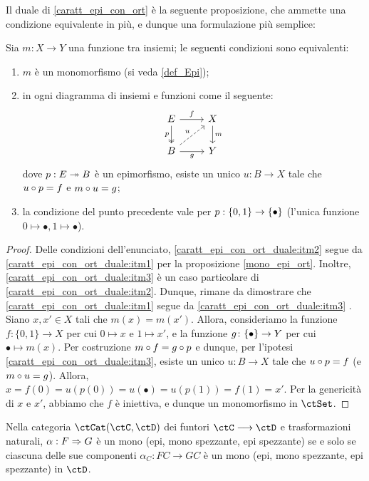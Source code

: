 Il duale di \ref{caratt_epi_con_ort} è la seguente proposizione, che ammette una condizione equivalente in più, e dunque una formulazione più semplice:
\begin{proposition}\label{caratt_epi_con_ort_duale}
	Sia \(m : X\to Y\) una funzione tra insiemi; le seguenti condizioni sono equivalenti:
	\begin{enumerate}
		\item\label{caratt_epi_con_ort_duale:itm1} \(m\) è un monomorfismo (si veda \ref{def_Epi});
		\item\label{caratt_epi_con_ort_duale:itm2} in ogni diagramma di insiemi e funzioni come il seguente:
		      \[\begin{tikzcd}
				      E \ar[r, "f"]\ar[d, two heads, "p"']& X \ar[d, "m"]\\
				      B \ar[r, "g"'] \ar[ur, dashed, "u"]& Y
			      \end{tikzcd}\]
		      dove \(p : E\twoheadrightarrow B\) è un epimorfismo, esiste un unico \(u : B\to X\) tale che \(u\circ p = f\) e \(m\circ u = g\);
		\item\label{caratt_epi_con_ort_duale:itm3} la condizione del punto precedente vale per \(p : \{0,1\} \to \{\bullet\}\) (l'unica funzione \(0\mapsto\bullet, 1\mapsto\bullet\)).
	\end{enumerate}
\end{proposition}
\begin{proof}
	Delle condizioni dell'enunciato, \ref{caratt_epi_con_ort_duale:itm2} segue da \ref{caratt_epi_con_ort_duale:itm1} per la proposizione \ref{mono_epi_ort}.
	Inoltre, \ref{caratt_epi_con_ort_duale:itm3} \`e un caso particolare di \ref{caratt_epi_con_ort_duale:itm2}.
	Dunque, rimane da dimostrare che \ref{caratt_epi_con_ort_duale:itm1} segue da \ref{caratt_epi_con_ort_duale:itm3} .
	Siano \(x, x' \in X\) tali che \(m(x) = m(x')\).
	Allora, consideriamo la funzione \(f \colon \{0, 1\} \to X\) per cui \(0 \mapsto x\) e \(1 \mapsto x'\),
	e la funzione \(g \colon \{\bullet\} \to Y\) per cui \(\bullet \mapsto m(x)\).
	Per costruzione \(m \circ f = g \circ p\) e dunque, per l'ipotesi \ref{caratt_epi_con_ort_duale:itm3}, esiste un unico \(u : B\to X\) tale che \(u\circ p = f\) (e \(m\circ u = g\)).
	Allora, \(x = f(0) = u(p(0)) = u(\bullet) = u(p(1)) = f(1) = x'\).
	Per la genericit\`a di \(x\) e \(x'\), abbiamo che \(f\) \`e iniettiva,
	e dunque un monomorfismo in \(\ctSet\).
\end{proof}
\begin{proposition}\label{monoepi_in_catCD}
	Nella categoria \(\Hom\ctCat(\ctC,\ctD)\) dei funtori \(\ctC\fun\ctD\) e trasformazioni naturali, \(\alpha : F\Rightarrow G\) è un mono (epi, mono spezzante, epi spezzante) se e solo se ciascuna delle sue componenti \(\alpha_C : FC\to GC\) è un mono (epi, mono spezzante, epi spezzante) in \(\ctD\).
\end{proposition}

